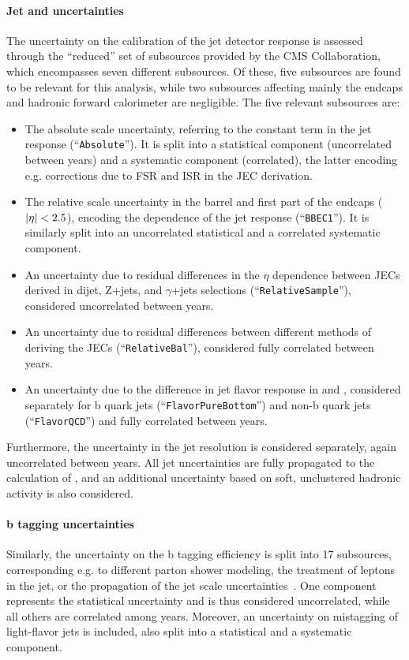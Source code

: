 \paragraph{Jet and \ptmiss uncertainties}
The uncertainty on the calibration of the jet \pt detector response is assessed through the ``reduced'' set of subsources provided by the CMS Collaboration, which encompasses seven different subsources. Of these, five subsources are found to be relevant for this analysis, while two subsources affecting mainly the endcaps and hadronic forward calorimeter are negligible. The five relevant subsources are:

\begin{itemize}
    \item The absolute scale uncertainty,  referring to the constant term in the jet \pt response (``\texttt{Absolute}''). It is split into a statistical component (uncorrelated between years) and a systematic component (correlated), the latter encoding e.g. corrections due to FSR and ISR in the JEC derivation.
    \item The relative scale uncertainty in the barrel and first part of the endcaps ($|\eta| < 2.5$), encoding the \pt dependence of the jet \pt response (``\texttt{BBEC1}''). It is similarly split into an uncorrelated statistical and a correlated systematic component.
    \item An uncertainty due to residual differences in the $\eta$ dependence between JECs derived in dijet, Z+jets, and $\gamma$+jets selections (``\texttt{RelativeSample}''), considered uncorrelated between years.
    \item An uncertainty due to residual differences between different methods of deriving the JECs (``\texttt{RelativeBal}''), considered fully correlated between years.
    \item An uncertainty due to the difference in jet flavor response in \pythia and \herwig, considered separately for b quark jets (``\texttt{FlavorPureBottom}'') and non-b quark jets (``\texttt{FlavorQCD}'') and fully correlated between years.
\end{itemize}

Furthermore, the uncertainty in the jet \pt resolution is considered separately, again uncorrelated between years. All jet uncertainties are fully propagated to the calculation of \ptmiss, and an additional \ptmiss uncertainty based on soft, unclustered hadronic activity is also considered.

\paragraph{b tagging uncertainties}
Similarly, the uncertainty on the b tagging efficiency is split into 17 subsources, corresponding e.g. to different parton shower modeling, the treatment of leptons in the jet, or the propagation of the jet \pt scale uncertainties~\cite{CMS:BTV-16-002}. One component represents the statistical uncertainty and is thus considered uncorrelated, while all others are correlated among years. Moreover, an uncertainty on mistagging of light-flavor jets is included, also split into a statistical and a systematic component.

